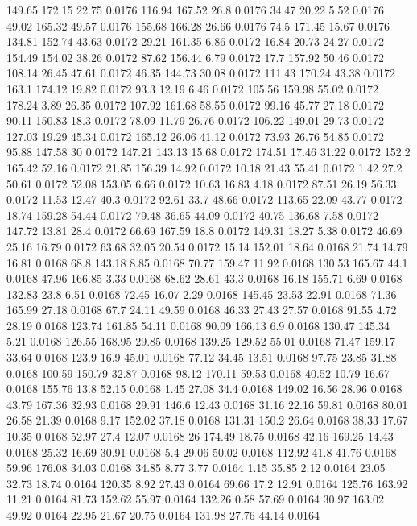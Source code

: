 149.65	172.15	22.75	0.0176
116.94	167.52	26.8	0.0176
34.47	20.22	5.52	0.0176
49.02	165.32	49.57	0.0176
155.68	166.28	26.66	0.0176
74.5	171.45	15.67	0.0176
134.81	152.74	43.63	0.0172
29.21	161.35	6.86	0.0172
16.84	20.73	24.27	0.0172
154.49	154.02	38.26	0.0172
87.62	156.44	6.79	0.0172
17.7	157.92	50.46	0.0172
108.14	26.45	47.61	0.0172
46.35	144.73	30.08	0.0172
111.43	170.24	43.38	0.0172
163.1	174.12	19.82	0.0172
93.3	12.19	6.46	0.0172
105.56	159.98	55.02	0.0172
178.24	3.89	26.35	0.0172
107.92	161.68	58.55	0.0172
99.16	45.77	27.18	0.0172
90.11	150.83	18.3	0.0172
78.09	11.79	26.76	0.0172
106.22	149.01	29.73	0.0172
127.03	19.29	45.34	0.0172
165.12	26.06	41.12	0.0172
73.93	26.76	54.85	0.0172
95.88	147.58	30	0.0172
147.21	143.13	15.68	0.0172
174.51	17.46	31.22	0.0172
152.2	165.42	52.16	0.0172
21.85	156.39	14.92	0.0172
10.18	21.43	55.41	0.0172
1.42	27.2	50.61	0.0172
52.08	153.05	6.66	0.0172
10.63	16.83	4.18	0.0172
87.51	26.19	56.33	0.0172
11.53	12.47	40.3	0.0172
92.61	33.7	48.66	0.0172
113.65	22.09	43.77	0.0172
18.74	159.28	54.44	0.0172
79.48	36.65	44.09	0.0172
40.75	136.68	7.58	0.0172
147.72	13.81	28.4	0.0172
66.69	167.59	18.8	0.0172
149.31	18.27	5.38	0.0172
46.69	25.16	16.79	0.0172
63.68	32.05	20.54	0.0172
15.14	152.01	18.64	0.0168
21.74	14.79	16.81	0.0168
68.8	143.18	8.85	0.0168
70.77	159.47	11.92	0.0168
130.53	165.67	44.1	0.0168
47.96	166.85	3.33	0.0168
68.62	28.61	43.3	0.0168
16.18	155.71	6.69	0.0168
132.83	23.8	6.51	0.0168
72.45	16.07	2.29	0.0168
145.45	23.53	22.91	0.0168
71.36	165.99	27.18	0.0168
67.7	24.11	49.59	0.0168
46.33	27.43	27.57	0.0168
91.55	4.72	28.19	0.0168
123.74	161.85	54.11	0.0168
90.09	166.13	6.9	0.0168
130.47	145.34	5.21	0.0168
126.55	168.95	29.85	0.0168
139.25	129.52	55.01	0.0168
71.47	159.17	33.64	0.0168
123.9	16.9	45.01	0.0168
77.12	34.45	13.51	0.0168
97.75	23.85	31.88	0.0168
100.59	150.79	32.87	0.0168
98.12	170.11	59.53	0.0168
40.52	10.79	16.67	0.0168
155.76	13.8	52.15	0.0168
1.45	27.08	34.4	0.0168
149.02	16.56	28.96	0.0168
43.79	167.36	32.93	0.0168
29.91	146.6	12.43	0.0168
31.16	22.16	59.81	0.0168
80.01	26.58	21.39	0.0168
9.17	152.02	37.18	0.0168
131.31	150.2	26.64	0.0168
38.33	17.67	10.35	0.0168
52.97	27.4	12.07	0.0168
26	174.49	18.75	0.0168
42.16	169.25	14.43	0.0168
25.32	16.69	30.91	0.0168
5.4	29.06	50.02	0.0168
112.92	41.8	41.76	0.0168
59.96	176.08	34.03	0.0168
34.85	8.77	3.77	0.0164
1.15	35.85	2.12	0.0164
23.05	32.73	18.74	0.0164
120.35	8.92	27.43	0.0164
69.66	17.2	12.91	0.0164
125.76	163.92	11.21	0.0164
81.73	152.62	55.97	0.0164
132.26	0.58	57.69	0.0164
30.97	163.02	49.92	0.0164
22.95	21.67	20.75	0.0164
131.98	27.76	44.14	0.0164

